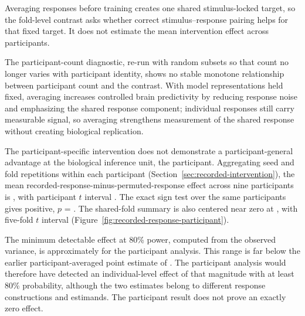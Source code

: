 Averaging responses before training creates one shared stimulus-locked target, so the fold-level contrast asks whether correct stimulus--response pairing helps for that fixed target.
It does not estimate the mean intervention effect across participants.

The participant-count diagnostic, re-run with random subsets so that count no longer varies with participant identity, shows no stable monotone relationship between participant count and the contrast.
With model representations held fixed, averaging increases controlled brain predictivity by reducing response noise and emphasizing the shared response component; individual responses still carry measurable signal, so averaging strengthens measurement of the shared response without creating biological replication.

The participant-specific intervention does not demonstrate a participant-general advantage at the biological inference unit, the participant.
Aggregating seed and fold repetitions within each participant (Section~\ref{sec:recorded-intervention}), the mean recorded-response-minus-permuted-response effect across nine participants is , with participant \(t\) interval .
The exact sign test over the same participants gives  positive, \(p\) = .
The shared-fold summary is also centered near zero at , with five-fold \(t\) interval  (Figure~\ref{fig:recorded-response-participant}).

The minimum detectable effect at 80\% power, computed from the observed variance, is approximately  for the participant analysis.
This range is far below the earlier participant-averaged point estimate of .
The participant analysis would therefore have detected an individual-level effect of that magnitude with at least 80\% probability, although the two estimates belong to different response constructions and estimands.
The participant result does not prove an exactly zero effect.


